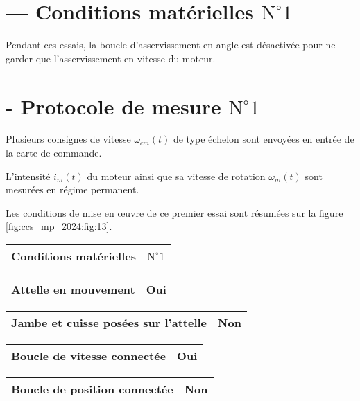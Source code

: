 \section*{— Conditions matérielles $\mathrm{N}^{\circ} 1$}
Pendant ces essais, la boucle d'asservissement en angle est désactivée pour ne garder que l'asservissement en vitesse du moteur.

\section*{- Protocole de mesure $\mathrm{N}^{\circ} 1$}
Plusieurs consignes de vitesse $\omega_{c m}(t)$ de type échelon sont envoyées en entrée de la carte de commande.

L'intensité $i_{m}(t)$ du moteur ainsi que sa vitesse de rotation $\omega_{m}(t)$ sont mesurées en régime permanent.

Les conditions de mise en œuvre de ce premier essai sont résumées sur la figure \ref{fig:ccs_mp_2024:fig:13}.

\begin{center}
\begin{tabular}{|l|l|}
\hline
Conditions matérielles & $\mathrm{N}^{\circ} 1$ \\
\hline
\end{tabular}
\end{center}

\begin{center}
\begin{tabular}{|l|l|}
\hline
Attelle en mouvement & Oui \\
\hline
\end{tabular}
\end{center}

\begin{center}
\begin{tabular}{|l|l|}
\hline
Jambe et cuisse posées sur l'attelle & Non \\
\hline
\end{tabular}
\end{center}

\begin{center}
\begin{tabular}{|l|l|}
\hline
Boucle de vitesse connectée & Oui \\
\hline
\end{tabular}
\end{center}

\begin{center}
\begin{tabular}{|l|l|}
\hline
Boucle de position connectée & Non \\
\hline
\end{tabular}
\end{center}

